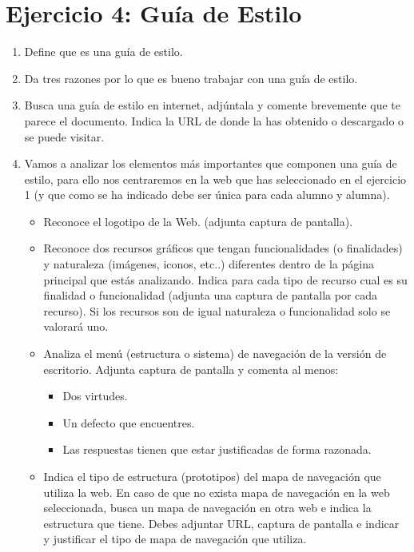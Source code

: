 \section{Ejercicio 4: Guía de Estilo}

\begin{enumerate}[label=\alph*)]
    \item Define que es una guía de estilo.
    \item Da tres razones por lo que es bueno trabajar con una guía de estilo.
    \item Busca una guía de estilo en internet, adjúntala y comente brevemente que te parece el documento. Indica la URL de donde la has obtenido o descargado o se puede visitar.
    \item Vamos a analizar los elementos más importantes que componen una guía de estilo, para ello nos centraremos en la web que has seleccionado en el ejercicio 1 (y que como se ha indicado debe ser única para cada alumno y alumna).
    \begin{itemize}
        \item Reconoce el logotipo de la Web. (adjunta captura de pantalla).
        \item Reconoce dos recursos gráficos que tengan funcionalidades (o finalidades) y naturaleza (imágenes, iconos, etc..) diferentes dentro de la página principal que estás analizando. Indica para cada tipo de recurso cual es su finalidad o funcionalidad (adjunta una captura de pantalla por cada recurso). Si los recursos son de igual naturaleza o funcionalidad solo se valorará uno.
        \item Analiza el menú (estructura o sistema) de navegación de la versión de escritorio. Adjunta captura de pantalla y comenta al menos:
        \begin{itemize}
            \item Dos virtudes.
            \item Un defecto que encuentres.
            \item Las respuestas tienen que estar justificadas de forma razonada.
        \end{itemize}

        \item Indica el tipo de estructura (prototipos) del mapa de navegación que utiliza la web. En caso de que no exista mapa de navegación en la web seleccionada, busca un mapa de navegación en otra web e indica la estructura que tiene. Debes adjuntar URL, captura de pantalla e indicar y justificar el tipo de mapa de navegación que utiliza.


\end{itemize}
\end{enumerate}
